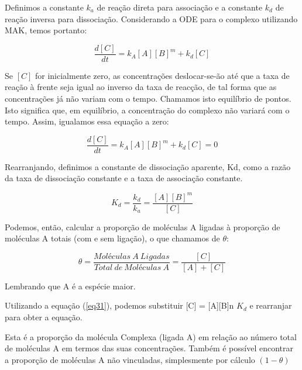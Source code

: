 \documentclass[11pt, letterpaper, portuguese]{article}
\begin{document}
    \par{Definimos a constante $k_a$ de reação direta para associação e a constante $k_d$ de reação inversa para dissociação. Considerando a ODE para o complexo utilizando MAK, temos portanto:}
    
    \begin{equation}
        \frac{d [C]}{d t}=k_A{[A]}[B]^m+k_d[C]
    \end{equation}
    
    \par{Se $[C]$ for inicialmente zero, as concentrações deslocar-se-ão até que a taxa de reação à frente seja igual ao inverso da taxa de reacção, de tal forma que as concentrações já não variam com o tempo. Chamamos isto equilíbrio de pontos. Isto significa que, em equilíbrio, a concentração do complexo não variará com o tempo. Assim, igualamos essa equação a zero:}
    
    \begin{equation}
        \frac{d [C]}{d t}=k_A{[A]}[B]^m+k_d[C]=0
    \end{equation}
    
    \par{Rearranjando, definimos a constante de dissociação aparente, Kd, como a razão da taxa de dissociação constante e a taxa de associação constante.}
    
    \begin{equation}
        K_d = \frac{k_d}{k_a}=\frac{[A]{[B]}^m}{[C]}
        \label{eq31}
    \end{equation}
    
    \par{Podemos, então, calcular a proporção de moléculas A ligadas à proporção de moléculas A totais (com e sem ligação), o que chamamos de $\theta$:}
    
    \begin{equation}
        \theta= \frac{Moléculas \ A \ Ligadas}{Total \ de \ Moléculas \ A}=\frac{[C]}{[A]+[C]}
    \end{equation}
    
    \par{Lembrando que A é a espécie maior.}
    
    \par{Utilizando a equação (\ref{eq31}), podemos substituir [C] = [A][B]n $K_d$ e rearranjar para obter a equação.
}


    
    \par{Esta é a proporção da molécula Complexa (ligada A) em relação ao número total de moléculas A em termos das suas concentrações. Também é possível encontrar a proporção de moléculas A não vinculadas, simplesmente por cálculo $(1-\theta)$}
    
\end{document}
